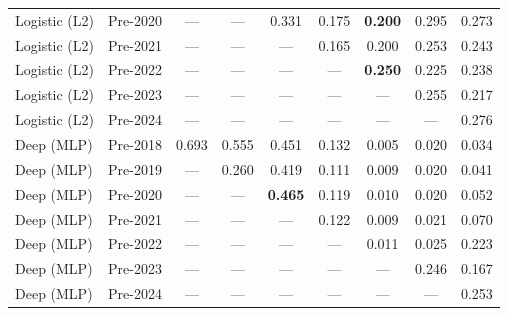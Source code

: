 \begin{table}[htbp]
{\begin{tabular}{l lccccccc}
Logistic (L2) & Pre-2020 & --- & --- & 0.331 & 0.175 & \textbf{0.200} & 0.295 & 0.273 \\
Logistic (L2) & Pre-2021 & --- & --- & --- & 0.165 & 0.200 & 0.253 & 0.243 \\
Logistic (L2) & Pre-2022 & --- & --- & --- & --- & \textbf{0.250} & 0.225 & 0.238 \\
Logistic (L2) & Pre-2023 & --- & --- & --- & --- & --- & 0.255 & 0.217 \\
Logistic (L2) & Pre-2024 & --- & --- & --- & --- & --- & --- & 0.276 \\
Deep (MLP) & Pre-2018 & 0.693 & 0.555 & 0.451 & 0.132 & 0.005 & 0.020 & 0.034 \\
Deep (MLP) & Pre-2019 & --- & 0.260 & 0.419 & 0.111 & 0.009 & 0.020 & 0.041 \\
Deep (MLP) & Pre-2020 & --- & --- & \textbf{0.465} & 0.119 & 0.010 & 0.020 & 0.052 \\
Deep (MLP) & Pre-2021 & --- & --- & --- & 0.122 & 0.009 & 0.021 & 0.070 \\
Deep (MLP) & Pre-2022 & --- & --- & --- & --- & 0.011 & 0.025 & 0.223 \\
Deep (MLP) & Pre-2023 & --- & --- & --- & --- & --- & 0.246 & 0.167 \\
Deep (MLP) & Pre-2024 & --- & --- & --- & --- & --- & --- & 0.253 \\
\bottomrule
\end{tabular}%
}
\end{table}